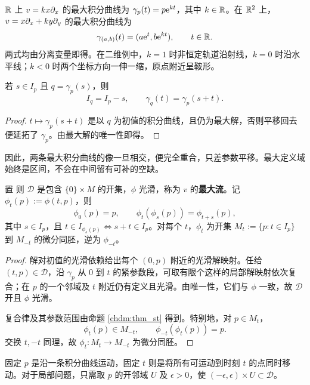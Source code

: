 \begin{example}
    $\mathbb{R}$ 上 $v=kx\partial_x$ 的最大积分曲线为 $\gamma_p(t)=p\mathrm{e}^{kt}$，其中 $k\in\mathbb{R}$。在 $\mathbb{R}^2$ 上，$v=x\partial_x+ky\partial_y$ 的最大积分曲线为
    \[
        \gamma_{(a,b)}(t)=(a\mathrm{e}^t,b\mathrm{e}^{kt}),\qquad t\in\mathbb{R}.
    \]
    两式均由分离变量即得。在二维例中，$k=1$ 时非恒定轨道沿射线，$k=0$ 时沿水平线；$k<0$ 时两个坐标方向一伸一缩，原点附近呈鞍形。
\end{example}

\begin{proposition}\label{chdm:thm_st}
    若 $s\in I_p$ 且 $q=\gamma_p(s)$，则
    \[
        I_q=I_p-s,\qquad \gamma_q(t)=\gamma_p(s+t).
    \]
\end{proposition}
\begin{proof}
    $t\mapsto\gamma_p(s+t)$ 是以 $q$ 为初值的积分曲线，且仍为最大解，否则平移回去便延拓了 $\gamma_p$。由最大解的唯一性即得。
\end{proof}

因此，两条最大积分曲线的像一旦相交，便完全重合，只差参数平移。最大定义域始终是区间，不会在中间留有可补的空缺。

\begin{theorem}[流的存在性]
    置
    则 $\mathcal D$ 是包含 $\{0\}\times M$ 的开集，$\phi$ 光滑，称为 $v$ 的\textbf{最大流}。记 $\phi_t(p):=\phi(t,p)$，则
    \[
        \phi_0(p)=p,\qquad \phi_t(\phi_s(p))=\phi_{t+s}(p),
    \]
    其中 $s\in I_p$，且 $t\in I_{\phi_s(p)}\iff s+t\in I_p$。对每个 $t$，$\phi_t$ 为开集 $M_t:=\{p:t\in I_p\}$ 到 $M_{-t}$ 的微分同胚，逆为 $\phi_{-t}$。
\end{theorem}
\begin{proof}
    解对初值的光滑依赖给出每个 $(0,p)$ 附近的光滑解映射。任给 $(t,p)\in\mathcal D$，沿 $\gamma_p$ 从 $0$ 到 $t$ 的紧参数段，可取有限个这样的局部解映射依次复合；在 $p$ 的一个邻域及 $t$ 附近仍有定义且光滑。由唯一性，它们与 $\phi$ 一致，故 $\mathcal D$ 开且 $\phi$ 光滑。

    复合律及其参数范围由命题 \ref{chdm:thm_st} 得到。特别地，对 $p\in M_t$，
    \[
        \phi_t(p)\in M_{-t},\qquad \phi_{-t}(\phi_t(p))=p.
    \]
    交换 $t,-t$ 同理，故 $\phi_t:M_t\to M_{-t}$ 为微分同胚。
\end{proof}

固定 $p$ 是沿一条积分曲线运动，固定 $t$ 则是将所有可运动到时刻 $t$ 的点同时移动。对于局部问题，只需取 $p$ 的开邻域 $U$ 及 $\epsilon>0$，使 $(-\epsilon,\epsilon)\times U\subset\mathcal D$。

